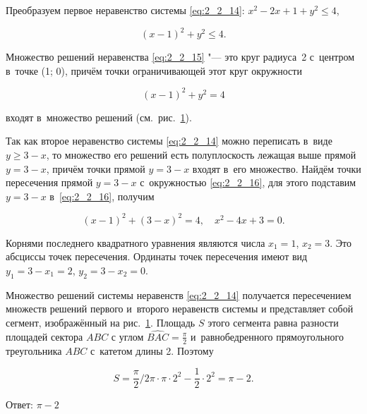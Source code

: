 Преобразуем первое неравенство системы \eqref{eq:2_2_14}:
$x^{2} - 2x + 1 + y^{2} \leqslant 4$,

\begin{equation}\label{eq:2_2_15}
(x - 1)^{2} + y^{2} \leqslant 4.
\end{equation}

\noindent
Множество решений неравенства \eqref{eq:2_2_15} "--- это круг радиуса~2
с~центром в~точке (1; 0), причём точки ограничивающей этот круг окружности

\begin{equation}\label{eq:2_2_16}
(x - 1)^{2} + y^{2} = 4
\end{equation}

\noindent
входят в~множество решений (см.\ рис.\ \ref{fig:2_2_5}).

\begin{figure}\label{fig:2_2_5}
\end{figure}

Так как второе неравенство системы \eqref{eq:2_2_14} можно переписать в~виде
$y \geqslant 3 - x$, то множество его решений есть полуплоскость лежащая выше
прямой $y = 3 - x$, причём точки прямой $y = 3 - x$ входят в~его множество.
Найдём точки пересечения прямой $y = 3 - x$ с~окружностью \eqref{eq:2_2_16},
для этого подставим $y = 3 - x$ в~\eqref{eq:2_2_16}, получим

\begin{equation*}
(x - 1)^{2} + (3 - x)^{2} = 4, \quad x^{2} - 4x + 3 = 0.
\end{equation*}

Корнями последнего квадратного уравнения являются числа $x_{1} = 1$, $x_{2} = 3$.
Это абсциссы точек пересечения. Ординаты точек пересечения имеют вид
$y_{1} = 3 - x_{1} = 2$, $y_{2} = 3 - {x_2} = 0$.

Множество решений системы неравенств \eqref{eq:2_2_14} получается пересечением
множеств решений первого и~второго неравенств системы и представляет собой
сегмент, изображённый на рис.\ \ref{fig:2_2_5}.
Площадь $S$ этого сегмента равна разности площадей сектора $ABC$ с углом
$\displaystyle \widehat{BAC} = \frac{\pi}{2}$ и~равнобедренного прямоугольного
треугольника $ABC$ с~катетом длины 2. Поэтому

\begin{equation*}
\displaystyle S = \frac{\pi}{2} / 2\pi \cdot \pi \cdot 2^{2} -
\frac{1}{2} \cdot 2^{2} = \pi - 2.
\end{equation*}

Ответ: $\pi - 2$

